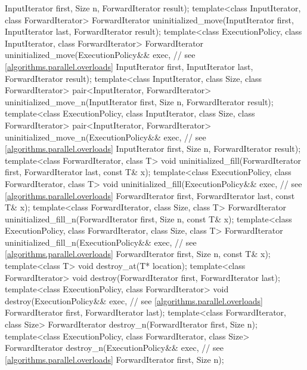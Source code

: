 \begin{codeblock}
{                                         InputIterator first, Size n,
                                         ForwardIterator result);
  template<class InputIterator, class ForwardIterator>
    ForwardIterator uninitialized_move(InputIterator first, InputIterator last,
                                       ForwardIterator result);
  template<class ExecutionPolicy, class InputIterator, class ForwardIterator>
    ForwardIterator uninitialized_move(ExecutionPolicy&& exec, // see \ref{algorithms.parallel.overloads}
                                       InputIterator first, InputIterator last,
                                       ForwardIterator result);
  template<class InputIterator, class Size, class ForwardIterator>
    pair<InputIterator, ForwardIterator> uninitialized_move_n(InputIterator first, Size n,
                                                              ForwardIterator result);
  template<class ExecutionPolicy, class InputIterator, class Size, class ForwardIterator>
    pair<InputIterator, ForwardIterator> uninitialized_move_n(ExecutionPolicy&& exec, // see \ref{algorithms.parallel.overloads}
                                                              InputIterator first, Size n,
                                                              ForwardIterator result);
  template<class ForwardIterator, class T>
    void uninitialized_fill(ForwardIterator first, ForwardIterator last, const T& x);
  template<class ExecutionPolicy, class ForwardIterator, class T>
    void uninitialized_fill(ExecutionPolicy&& exec, // see \ref{algorithms.parallel.overloads}
                            ForwardIterator first, ForwardIterator last, const T& x);
  template<class ForwardIterator, class Size, class T>
    ForwardIterator uninitialized_fill_n(ForwardIterator first, Size n, const T& x);
  template<class ExecutionPolicy, class ForwardIterator, class Size, class T>
    ForwardIterator uninitialized_fill_n(ExecutionPolicy&& exec, // see \ref{algorithms.parallel.overloads}
                                         ForwardIterator first, Size n, const T& x);
  template<class T>
    void destroy_at(T* location);
  template<class ForwardIterator>
    void destroy(ForwardIterator first, ForwardIterator last);
  template<class ExecutionPolicy, class ForwardIterator>
    void destroy(ExecutionPolicy&& exec, // see \ref{algorithms.parallel.overloads}
                 ForwardIterator first, ForwardIterator last);
  template<class ForwardIterator, class Size>
    ForwardIterator destroy_n(ForwardIterator first, Size n);
  template<class ExecutionPolicy, class ForwardIterator, class Size>
    ForwardIterator destroy_n(ExecutionPolicy&& exec, // see \ref{algorithms.parallel.overloads}
                              ForwardIterator first, Size n);

}
\end{codeblock}
